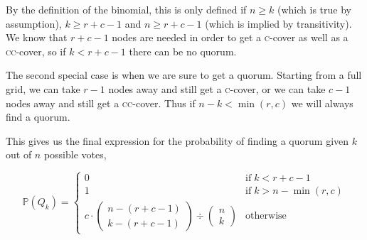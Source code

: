 \documentclass[10pt]{scrartcl}
\begin{document}
By the definition of the binomial, this is only defined if \(n \geq k\) (which is true by assumption), \(k \geq r+c-1\) and \(n \geq r+c-1\) (which is implied by transitivity). We know that \(r+c-1\) nodes are needed in order to get a \textsc{c}-cover as well as a \textsc{cc}-cover, so if \(k < r+c-1\) there can be no quorum.

The second special case is when we are sure to get a quorum. Starting from a full grid, we can take \(r-1\) nodes away and still get a  \textsc{c}-cover, or we can take \(c-1\) nodes away and still get a \textsc{cc}-cover. Thus if \(n-k < \min(r,c)\) we will always find a quorum.

This gives us the final expression for the probability of finding a quorum given \(k\) out of \(n\) possible votes,

\[
\mathbb{P}(Q_k) =
    \begin{cases}
        0 & \text{if}\;k < r+c-1 \\
        1 & \text{if}\;k > n - \min(r,c) \\
        {c \cdot \begin{pmatrix}n-(r+c-1) \\ k-(r+c-1)\end{pmatrix}} \div {\begin{pmatrix}n \\ k\end{pmatrix}} & \text{otherwise}
    \end{cases}
\]



\end{document}
